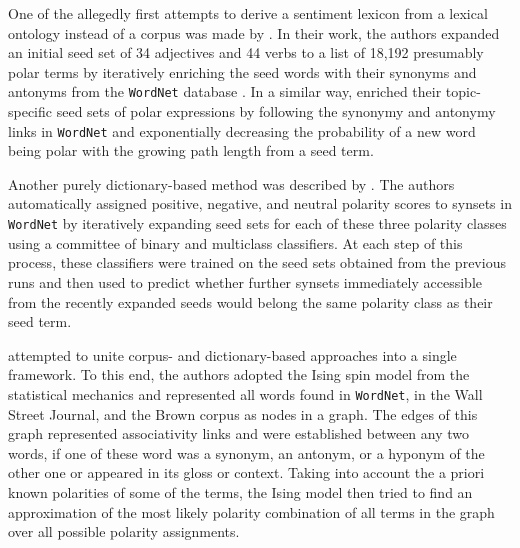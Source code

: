 One of the allegedly first attempts to derive a sentiment lexicon from
a lexical ontology instead of a corpus was made by \citet{Kim:04}.  In
their work, the authors expanded an initial seed set of 34 adjectives
and 44 verbs to a list of 18,192 presumably polar terms by iteratively
enriching the seed words with their synonyms and antonyms from the
\texttt{WordNet} database \citep{Miller:95}. In a similar way,
\citet{Godbole:07} enriched their topic-specific seed sets of polar
expressions by following the synonymy and antonymy links in
\texttt{WordNet} and exponentially decreasing the probability of a new
word being polar with the growing path length from a seed term.




Another purely dictionary-based method was described by
\citet{Esuli:06b}.  The authors automatically assigned positive,
negative, and neutral polarity scores to synsets in \texttt{WordNet}
by iteratively expanding seed sets for each of these three polarity
classes using a committee of binary and multiclass classifiers.  At
each step of this process, these classifiers were trained on the seed
sets obtained from the previous runs and then used to predict whether
further synsets immediately accessible from the recently expanded
seeds would belong the same polarity class as their seed term.

\citet{Takamura:05} attempted to unite corpus- and dictionary-based
approaches into a single framework.  To this end, the authors adopted
the Ising spin model from the statistical mechanics and represented
all words found in \texttt{WordNet}, in the Wall Street Journal, and
the Brown corpus as nodes in a graph.  The edges of this graph
represented associativity links and were established between any two
words, if one of these word was a synonym, an antonym, or a hyponym of
the other one or appeared in its gloss or context.  Taking into
account the a priori known polarities of some of the terms, the Ising
model then tried to find an approximation of the most likely polarity
combination of all terms in the graph over all possible polarity
assignments.

